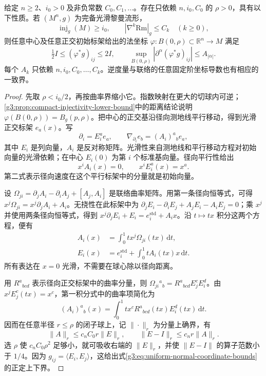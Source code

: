 \begin{lemma}\label{g3:lem:uniform-normal-coordinate-bounds}
	给定 \(n\ge2\)、\(i_0>0\) 及非负常数 \(C_0,C_1,\ldots\)。存在只依赖 \(n,i_0,C_0\) 的 \(\rho>0\)，具有以下性质。若 \((M^n,g)\) 为完备光滑黎曼流形，
	\[
		\operatorname{inj}_g(M)\ge i_0,\qquad
		|\nabla^k\mathrm{Rm}|_g\le C_k\quad(k\ge0),
	\]
	则任意中心及任意正交初始标架给出的法坐标
	\(\varphi:B(0,\rho)\subset\mathbb R^n\to M\) 满足
	\begin{equation}\label{g3:eq:uniform-normal-coordinate-bounds}
		\tfrac12 I\le (\varphi^*g)_{ij}\le2I,\qquad
		\sup_{B(0,\rho)}|\partial^\alpha(\varphi^*g)_{ij}|
		\le A_{|\alpha|}.
	\end{equation}
	每个 \(A_k\) 只依赖 \(n,i_0,C_0,\ldots,C_k\)。逆度量与联络的任意固定阶坐标导数也有相应的一致界。
\end{lemma}
\begin{proof}
	先取 \(\rho<i_0/2\)，再按曲率界缩小它。指数映射在更大的切球内可逆；\cref{g3:prop:compact-injectivity-lower-bound}中的距离结论说明 \(\varphi(B(0,\rho))=B_g(p,\rho)\)。把中心的正交基沿径向测地线平行移动，得到光滑正交标架 \(e_a(x)\)。写
	\[
		\partial_i=E_i^ae_a,\qquad
		\nabla_{\partial_i}e_b=(A_i)^a{}_b e_a,
	\]
	其中 \(E_i\) 是列向量，\(A_i\) 是反对称矩阵。光滑性来自测地线和平行移动方程对初始向量的光滑依赖；在中心 \(E_i(0)\) 为第 \(i\) 个标准基向量。径向平行性给出
	\begin{equation}\label{g3:eq:normal-radial-gauge}
		x^iA_i(x)=0,\qquad x^iE_i^a(x)=x^a.
	\end{equation}
	第二式表示径向速度在这个平行标架中的分量就是初始向量。

	设 \(\Omega_{ji}=\partial_jA_i-\partial_iA_j+[A_j,A_i]\) 是联络曲率矩阵。用第一条径向恒等式，可得
	\(x^j\Omega_{ji}=x^j\partial_jA_i+A_i\)。无挠性在此标架中为
	\(\partial_jE_i-\partial_iE_j+A_jE_i-A_iE_j=0\)；乘 \(x^j\) 并使用两条径向恒等式，得到
	\(x^j\partial_jE_i+E_i=e_i^{\mathrm{std}}+A_i x\)。沿 \(t\mapsto tx\) 积分这两个方程，便有
	\begin{equation}\label{g3:eq:normal-radial-integral-system}
		\begin{split}
			A_i(x)&=\int_0^1t x^j\Omega_{ji}(tx)\,\mathrm dt,\\
			E_i(x)&=e_i^{\mathrm{std}}+
			\int_0^1t A_i(tx)x\,\mathrm dt.
		\end{split}
	\end{equation}
	所有表达在 \(x=0\) 光滑，不需要在球心除以径向距离。

	用 \(R^a{}_{bcd}\) 表示径向正交标架中的曲率分量，则
	\(\Omega_{ji}{}^a{}_b=R^a{}_{bcd}E_j^cE_i^d\)。由
	\(x^jE_j^c(tx)=x^c\)，第一积分式中的曲率项简化为
	\[
		(A_i)^a{}_b(x)=\int_0^1t x^c
		R^a{}_{bcd}(tx)E_i^d(tx)\,\mathrm dt.
	\]
	因而在任意半径 \(r\le\rho\) 的闭子球上，记 \(\|\cdot\|_r\) 为分量上确界，有
	\[
		\|A\|_r\le c_nC_0r\|E\|_r,\qquad
		\|E-I\|_r\le c_nr\|A\|_r.
	\]
	选 \(\rho\) 使 \(c_nC_0\rho^2\) 足够小，就可吸收右端的 \(\|E\|_r\)，并使 \(\|E-I\|\) 的算子范数小于 \(1/4\)。因为 \(g_{ij}=\langle E_i,E_j\rangle\)，这给出式\eqref{g3:eq:uniform-normal-coordinate-bounds}的正定上下界。


\end{proof}
